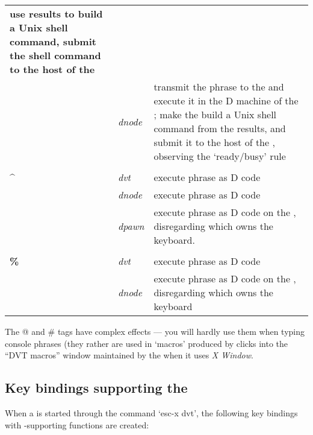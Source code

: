 \begin{supertabular}{>{\bfseries}L>{\itshape}L>{\sffamily}p{0.75\textwidth}}
                    use results to build a Unix shell command, 
                    submit the shell command to the host of the \\
         & dnode  & transmit the phrase to the  
                    and execute it in the D machine of the ; 
                    make the  build a Unix shell command from the 
                    results, and submit it to the host of the , 
                    observing the `ready/busy' rule \\\\\relax
  ^       & dvt   & execute phrase as D code\\
          & dnode & execute phrase as D code\\
          & dpawn & execute phrase as D code on the , 
                    disregarding which  owns the keyboard.\\\\
  \%      & dvt   & execute phrase as D code\\
          & dnode & execute phrase as D code on the , 
                    disregarding which  owns the keyboard\\
\end{supertabular}

The @ and \# tags have complex effects --- you will hardly use them when typing console phrases (they rather are used in `macros' produced by clicks into the ``DVT macros'' window maintained by the  when it uses \emph{X Window}.

\subsection{Key bindings supporting the }

When a  is started through the  command `esc-x dvt', the following key bindings with -supporting  functions are created:\\ 

